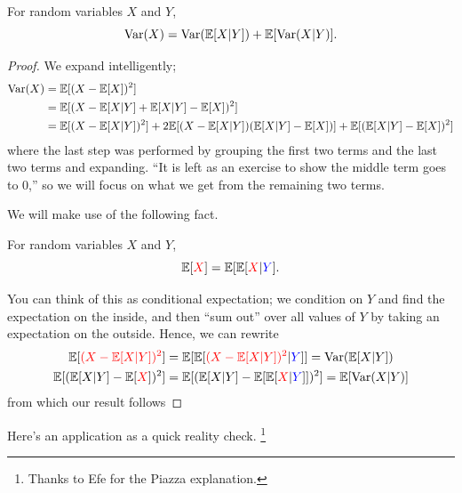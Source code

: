 \documentclass[11 pt]{scrartcl}
\begin{document}
\begin{theorem}
    For random variables $X$ and $Y$, 
    \[ \text{Var}(X) = \text{Var}(\mathbb E[X|Y]) + \mathbb E[\text{Var}(X|Y)].\] 
\end{theorem}
\begin{proof}
We expand intelligently; 
\begin{align*}
    \text{Var}(X) &= \mathbb E[(X-\mathbb E[X])^2] \\ 
            &= \mathbb E[(X - \mathbb E[X|Y] + \mathbb E[X|Y] - \mathbb E[X])^2] \\ 
            &= \mathbb E[(X-\mathbb E[X|Y])^2] + 2\mathbb E[(X-\mathbb E[X|Y])(\mathbb E[X|Y]-\mathbb E[X])] + \mathbb E[(\mathbb E[X|Y] - \mathbb E[X])^2] 
\end{align*}
where the last step was performed by grouping the first two terms and the last two terms and expanding. ``It is left as an exercise to show the middle term goes to 0,'' so we will focus on what we get from the remaining two terms. 

We will make use of the following fact. 

\begin{theorem}
    For random variables $X$ and $Y$, 
    \[ \mathbb E[{\color{red}X}] = \mathbb E[\mathbb E[{\color{red}X} | {\color{blue}Y}].\] 
\end{theorem}

You can think of this as conditional expectation; we condition on $Y$ and find the expectation on the inside, and then ``sum out'' over all values of $Y$ by taking an expectation on the outside. Hence, we can rewrite 
\begin{align*}
    \mathbb E[{\color{red}(X-\mathbb E[X|Y])^2}] &= \mathbb E[\mathbb E[{\color{red}(X-\mathbb E[X|Y])^2} | {\color{blue}Y}]] = \text{Var}(\mathbb E[X|Y]) \\
\mathbb E[(\mathbb E[X|Y] - \mathbb E[{\color{red}X}])^2] &= \mathbb E[(\mathbb E[X|Y] - \mathbb E[\mathbb E[{\color{red}X}|{\color{blue}Y}]])^2] = \mathbb E[\text{Var}(X|Y)]
\end{align*}
from which our result follows 
\end{proof}

Here's an application as a quick reality check. \footnote{Thanks to Efe for the Piazza explanation.}
\end{document}
